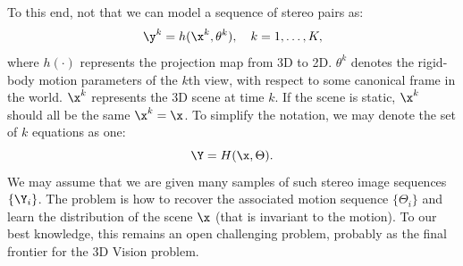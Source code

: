 \documentclass[../../book-main.tex]{subfiles}
\begin{document}

To this end, not that we can model a sequence of stereo pairs as:
\begin{equation}
    \y^k = h(\x^k, \theta^k), \quad k=1, \ldots, K,
\end{equation}
where $h(\cdot)$ represents the projection map from 3D to 2D. $\theta^k$ denotes the rigid-body motion parameters of the $k$th view, with respect to some canonical frame in the world. $\x^k$ represents the 3D scene at time $k$. If the scene is static, $\x^k$ should all be the same $\x^k = \x$. To simplify the notation, we may denote the set of $k$ equations as one:
\begin{equation}
    \Y = H(\x,\Theta). 
\end{equation}
We may assume that we are given many samples of such stereo image sequences $\{\Y_i\}$. The problem is how to recover the associated motion sequence $\{\Theta_i\}$ and learn the distribution of the scene $\x$ (that is invariant to the motion). To our best knowledge, this remains an open challenging problem, probably as the final frontier for the 3D Vision problem. 


\end{document}
